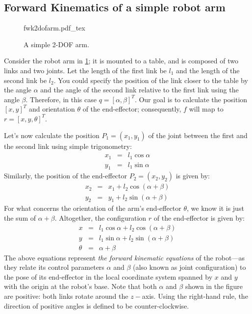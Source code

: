 \subsection{Forward Kinematics of a simple robot arm}\label{sec:kinematics:fwk:arm}

\begin{figure}[!htb]%
    \centering
    \def\svgwidth{0.4\textwidth}
    {fwk2dofarm.pdf_tex}
    \caption{A simple 2-DOF arm.}\label{fig:fwk2dofarm}
\end{figure}

Consider the robot arm in \cref{fig:fwk2dofarm}; it is mounted to a table, and is composed of two links and two joints. Let the length of the first link be $l_1$ and the length of the second link be $l_2$. You could specify the position of the link closer to the table by the angle $\alpha$ and the angle of the second link relative to the first link using the angle $\beta$.
Therefore, in this case $q = [\alpha, \beta]^T$.
Our goal is to calculate the position $[x, y]^T$ and orientation $\theta$ of the end-effector; consequently, $f$ will map to $r = [x, y, \theta]^T$.

Let's now calculate the position $P_1 = (x_1, y_1)$ of the joint between the first and the second link using simple trigonometry:
%
\begin{eqnarray}\label{eq:cosxl1}
x_1 &=&l_1 \cos \alpha \nonumber \\
y_1 &=&l_1 \sin \alpha
\end{eqnarray}
%
Similarly, the position of the end-effector $P_2 = (x_2, y_2)$ is given by:
%
\begin{eqnarray}
x_2&=&x_1 + l_2 \cos(\alpha+\beta) \nonumber \\
y_2&=&y_1 + l_2 \sin(\alpha+\beta)
\end{eqnarray}
%
For what concerns the orientation of the arm's end-effector $\theta$, we know it is just the sum of $\alpha+\beta$.
Altogether, the configuration $r$ of the end-effector is given by:
%
\begin{eqnarray}\label{eq:fwk2dofarm}
x&=&l_1 \cos \alpha + l_2 \cos(\alpha+\beta) \nonumber \\
y&=&l_1 \sin \alpha + l_2 \sin(\alpha+\beta) \\
\theta&=& \alpha + \beta \nonumber
\end{eqnarray}
%
The above equations represent \textsl{the forward kinematic equations} of the robot---as they relate its control parameters $ \alpha$ and $\beta$ (also known as joint configuration) to the pose of its end-effector in the local coordinate system spanned by $x$ and $ y$ with the origin at the robot's base.
Note that both $\alpha$ and $\beta$ shown in the figure are positive: both links rotate around the $z-$axis. Using the right-hand rule, the direction of positive angles is defined to be counter-clockwise.

